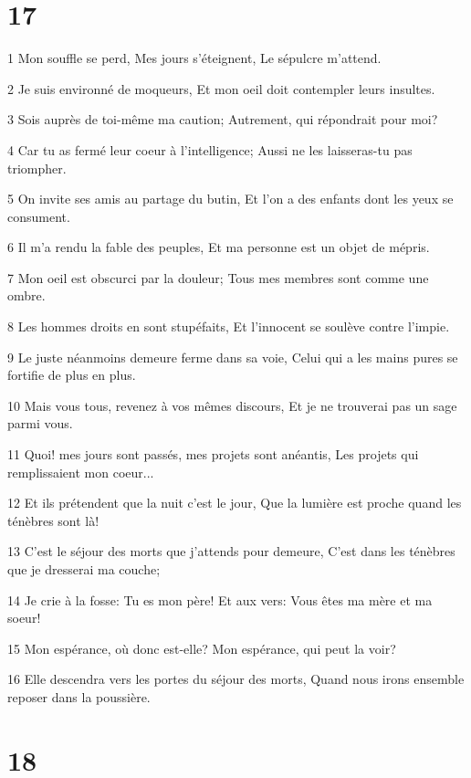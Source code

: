 \chapter{17}

\par 1 Mon souffle se perd, Mes jours s'éteignent, Le sépulcre m'attend.
\par 2 Je suis environné de moqueurs, Et mon oeil doit contempler leurs insultes.
\par 3 Sois auprès de toi-même ma caution; Autrement, qui répondrait pour moi?
\par 4 Car tu as fermé leur coeur à l'intelligence; Aussi ne les laisseras-tu pas triompher.
\par 5 On invite ses amis au partage du butin, Et l'on a des enfants dont les yeux se consument.
\par 6 Il m'a rendu la fable des peuples, Et ma personne est un objet de mépris.
\par 7 Mon oeil est obscurci par la douleur; Tous mes membres sont comme une ombre.
\par 8 Les hommes droits en sont stupéfaits, Et l'innocent se soulève contre l'impie.
\par 9 Le juste néanmoins demeure ferme dans sa voie, Celui qui a les mains pures se fortifie de plus en plus.
\par 10 Mais vous tous, revenez à vos mêmes discours, Et je ne trouverai pas un sage parmi vous.
\par 11 Quoi! mes jours sont passés, mes projets sont anéantis, Les projets qui remplissaient mon coeur...
\par 12 Et ils prétendent que la nuit c'est le jour, Que la lumière est proche quand les ténèbres sont là!
\par 13 C'est le séjour des morts que j'attends pour demeure, C'est dans les ténèbres que je dresserai ma couche;
\par 14 Je crie à la fosse: Tu es mon père! Et aux vers: Vous êtes ma mère et ma soeur!
\par 15 Mon espérance, où donc est-elle? Mon espérance, qui peut la voir?
\par 16 Elle descendra vers les portes du séjour des morts, Quand nous irons ensemble reposer dans la poussière.

\chapter{18}

